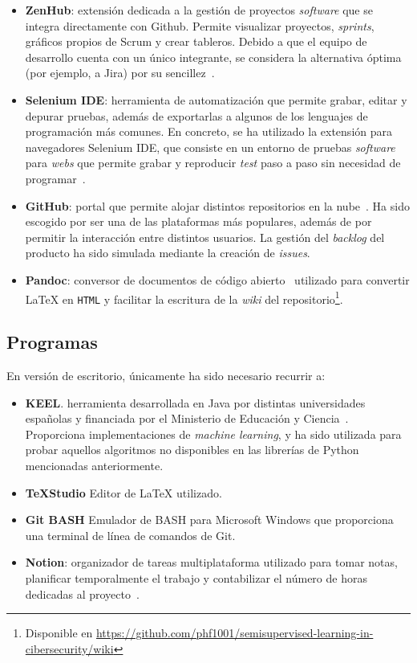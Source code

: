 \begin{itemize}
	\item \textbf{ZenHub}: extensión dedicada a la gestión de proyectos \textit{software} que se integra directamente con Github. Permite visualizar proyectos, \textit{sprints}, gráficos propios de Scrum y crear tableros. Debido a que el equipo de desarrollo cuenta con un único integrante, se considera la alternativa óptima (por ejemplo, a Jira) por su sencillez~\cite{zenhubHome}.
	
	\item \textbf{Selenium IDE}: herramienta de automatización que permite grabar, editar y depurar pruebas, además de exportarlas a algunos de los lenguajes de programación más comunes. En concreto, se ha utilizado la extensión para navegadores Selenium IDE, que consiste en un entorno de pruebas \textit{software} para \textit{webs} que permite grabar y reproducir \textit{test} paso a paso sin necesidad de programar~\cite{seleniumIDE}.
	
	\item \textbf{GitHub}: portal que permite alojar distintos repositorios en la nube~\cite{githubHome}. Ha sido escogido por ser una de las plataformas más populares, además de por permitir la interacción entre distintos usuarios. La gestión del \textit{backlog} del producto ha sido simulada mediante la creación de \textit{issues}.
	
	\item \textbf{Pandoc}: conversor de documentos de código abierto~\cite{pandoc} utilizado para convertir \LaTeX{} en \texttt{HTML} y facilitar la escritura de la \textit{wiki} del repositorio\footnote{Disponible en \url{https://github.com/phf1001/semisupervised-learning-in-cibersecurity/wiki}}.
\end{itemize}

\subsection{Programas}

En versión de escritorio, únicamente ha sido necesario recurrir a:

\begin{itemize}
	\item \textbf{KEEL}. herramienta desarrollada en Java por distintas universidades españolas y financiada por el Ministerio de Educación y Ciencia~\cite{keelRepo}. Proporciona implementaciones de \textit{machine learning}, y ha sido utilizada para probar aquellos algoritmos no disponibles en las librerías de Python mencionadas anteriormente.
	\item \textbf{\TeX{}Studio}
	Editor de \LaTeX{} utilizado.
	\item \textbf{Git BASH}
	Emulador de BASH para Microsoft Windows que proporciona una terminal de línea de comandos de Git.
	\item \textbf{Notion}: organizador de tareas multiplataforma utilizado para tomar notas, planificar temporalmente el trabajo y contabilizar el número de horas dedicadas al proyecto~\cite{notion}.
\end{itemize}


